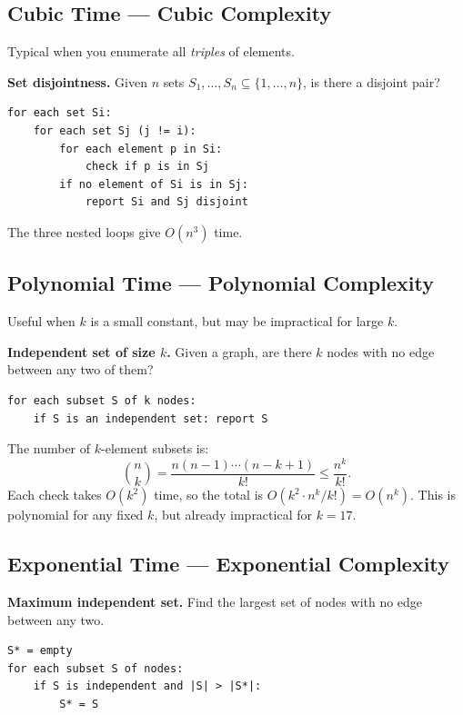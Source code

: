 \documentclass[12pt,a4paper]{report}
\begin{document}
\subsection{Cubic Time — Cubic Complexity}

Typical when you enumerate all \emph{triples} of elements.

\textbf{Set disjointness.} Given $n$ sets $S_1, \ldots, S_n \subseteq \{1, \ldots, n\}$,
is there a disjoint pair?

\begin{Verbatim}[frame=single]
for each set Si:
    for each set Sj (j != i):
        for each element p in Si:
            check if p is in Sj
        if no element of Si is in Sj:
            report Si and Sj disjoint
\end{Verbatim}

The three nested loops give $O(n^3)$ time.

\subsection{Polynomial Time — Polynomial Complexity}

Useful when $k$ is a small constant, but may be impractical for large $k$.

\textbf{Independent set of size $k$.} Given a graph, are there $k$ nodes with no edge
between any two of them?

\begin{Verbatim}[frame=single]
for each subset S of k nodes:
    if S is an independent set: report S
\end{Verbatim}

The number of $k$-element subsets is:
\[
    \binom{n}{k} = \frac{n(n-1)\cdots(n-k+1)}{k!} \leq \frac{n^k}{k!}.
\]
Each check takes $O(k^2)$ time, so the total is $O(k^2 \cdot n^k / k!) = O(n^k)$.
This is polynomial for any fixed $k$, but already impractical for $k = 17$.

\subsection{Exponential Time — Exponential Complexity}

\textbf{Maximum independent set.} Find the largest set of nodes with no edge between
any two.

\begin{Verbatim}[frame=single]
S* = empty
for each subset S of nodes:
    if S is independent and |S| > |S*|:
        S* = S
\end{Verbatim}
\end{document}
